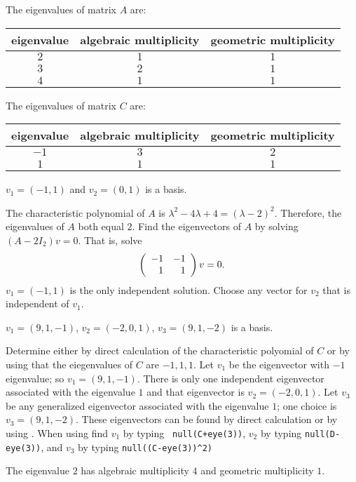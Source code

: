  The eigenvalues of matrix $A$ are:
\begin{center}
\begin{tabular}{|c|c|c|}
\hline
eigenvalue & algebraic multiplicity & geometric multiplicity \\
\hline
$2$ & $1$ & $1$ \\
$3$ & $2$ & $1$ \\
$4$ & $1$ & $1$ \\
\hline
\end{tabular}
\end{center}

\newpage
{} The eigenvalues of matrix $C$ are:
\begin{center}
\begin{tabular}{|c|c|c|}
\hline
eigenvalue & algebraic multiplicity & geometric multiplicity \\
\hline
$-1$ & $3$ & $2$ \\
$1$ & $1$ & $1$ \\
\hline
\end{tabular}
\end{center}

 \ans $v_1=(-1,1)$ and $v_2 = (0,1)$ is a basis.

\soln  The characteristic polynomial of $A$ is $\lambda^2-4\lambda+4=(\lambda-2)^2$.
Therefore, the eigenvalues of $A$ both equal $2$.  Find the eigenvectors of $A$ by 
solving $(A-2I_2)v=0$.  That is, solve
\[
\left(\begin{array}{rr} -1 & -1\\ 1 &1\end{array}\right)v = 0.
\]
$v_1=(-1,1)$ is the only independent solution.  Choose any vector for $v_2$ that is
independent of $v_1$.

 \ans $v_1=(9,1,-1)$, $v_2=(-2,0,1)$, $v_3=(9,1,-2)$ is a basis.

\soln  Determine either by direct calculation of the characteristic polyomial of $C$ 
or by using \Matlab that the eiegenvalues of $C$ are $-1,1,1$.  Let $v_1$ be the
eigenvector with $-1$ eigenvalue; so $v_1=(9,1,-1)$.  There is only one independent 
eigenvector associated with the eigenvalue $1$ and that eigenvector is
$v_2=(-2,0,1)$.  Let $v_3$ be any generalized eigenvector associated with the
eigenvalue $1$; one choice is $v_3=(9,1,-2)$.  These eigenvectors can be found by
direct calculation or by using \Matlab.  When using \Matlab find $v_1$ by typing {\tt
null(C+eye(3))}, $v_2$ by typing {\tt null(D-eye(3))}, and $v_3$ by typing 
{\tt null((C-eye(3))\^{}2)}

 \ans The eigenvalue $2$ has algebraic multiplicity $4$ and geometric
multiplicity $1$.

